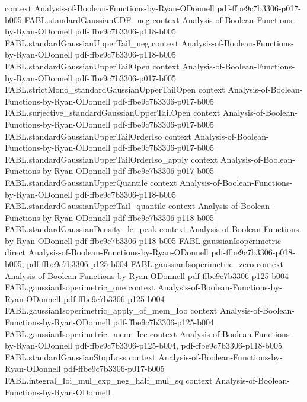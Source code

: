 \begin{theorem}
  {context}
  {Analysis-of-Boolean-Functions-by-Ryan-ODonnell}
  {pdf-ffbe9c7b3306-p017-b005}
\proofstep
  {FABL.standardGaussianCDF_neg}
  {context}
  {Analysis-of-Boolean-Functions-by-Ryan-ODonnell}
  {pdf-ffbe9c7b3306-p118-b005}
\proofstep
  {FABL.standardGaussianUpperTail_neg}
  {context}
  {Analysis-of-Boolean-Functions-by-Ryan-ODonnell}
  {pdf-ffbe9c7b3306-p118-b005}
\proofstep
  {FABL.standardGaussianUpperTailOpen}
  {context}
  {Analysis-of-Boolean-Functions-by-Ryan-ODonnell}
  {pdf-ffbe9c7b3306-p017-b005}
\proofstep
  {FABL.strictMono_standardGaussianUpperTailOpen}
  {context}
  {Analysis-of-Boolean-Functions-by-Ryan-ODonnell}
  {pdf-ffbe9c7b3306-p017-b005}
\proofstep
  {FABL.surjective_standardGaussianUpperTailOpen}
  {context}
  {Analysis-of-Boolean-Functions-by-Ryan-ODonnell}
  {pdf-ffbe9c7b3306-p017-b005}
\proofstep
  {FABL.standardGaussianUpperTailOrderIso}
  {context}
  {Analysis-of-Boolean-Functions-by-Ryan-ODonnell}
  {pdf-ffbe9c7b3306-p017-b005}
\proofstep
  {FABL.standardGaussianUpperTailOrderIso_apply}
  {context}
  {Analysis-of-Boolean-Functions-by-Ryan-ODonnell}
  {pdf-ffbe9c7b3306-p017-b005}
\proofstep
  {FABL.standardGaussianUpperQuantile}
  {context}
  {Analysis-of-Boolean-Functions-by-Ryan-ODonnell}
  {pdf-ffbe9c7b3306-p118-b005}
\proofstep
  {FABL.standardGaussianUpperTail_quantile}
  {context}
  {Analysis-of-Boolean-Functions-by-Ryan-ODonnell}
  {pdf-ffbe9c7b3306-p118-b005}
\proofstep
  {FABL.standardGaussianDensity_le_peak}
  {context}
  {Analysis-of-Boolean-Functions-by-Ryan-ODonnell}
  {pdf-ffbe9c7b3306-p118-b005}
\proofstep
  {FABL.gaussianIsoperimetric}
  {direct}
  {Analysis-of-Boolean-Functions-by-Ryan-ODonnell}
  {pdf-ffbe9c7b3306-p018-b005,
    pdf-ffbe9c7b3306-p125-b004}
\proofstep
  {FABL.gaussianIsoperimetric_zero}
  {context}
  {Analysis-of-Boolean-Functions-by-Ryan-ODonnell}
  {pdf-ffbe9c7b3306-p125-b004}
\proofstep
  {FABL.gaussianIsoperimetric_one}
  {context}
  {Analysis-of-Boolean-Functions-by-Ryan-ODonnell}
  {pdf-ffbe9c7b3306-p125-b004}
\proofstep
  {FABL.gaussianIsoperimetric_apply_of_mem_Ioo}
  {context}
  {Analysis-of-Boolean-Functions-by-Ryan-ODonnell}
  {pdf-ffbe9c7b3306-p125-b004}
\proofstep
  {FABL.gaussianIsoperimetric_mem_Icc}
  {context}
  {Analysis-of-Boolean-Functions-by-Ryan-ODonnell}
  {pdf-ffbe9c7b3306-p125-b004,
    pdf-ffbe9c7b3306-p118-b005}
\proofstep
  {FABL.standardGaussianStopLoss}
  {context}
  {Analysis-of-Boolean-Functions-by-Ryan-ODonnell}
  {pdf-ffbe9c7b3306-p017-b005}
\proofstep
  {FABL.integral_Ioi_mul_exp_neg_half_mul_sq}
  {context}
  {Analysis-of-Boolean-Functions-by-Ryan-ODonnell}

\end{theorem}
